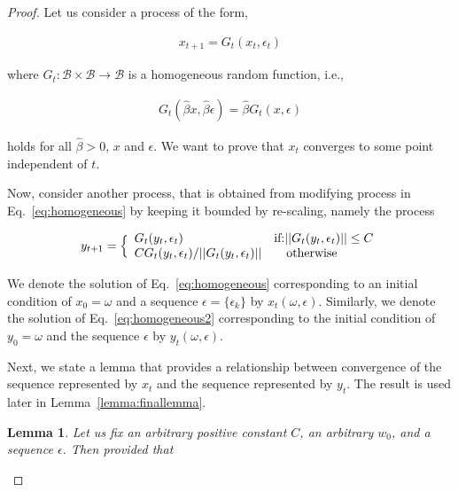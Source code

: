 \documentclass[jair, twoside,11pt,theapa]{article}
\newtheorem{lemm}{Lemma}
\begin{document}
\begin{proof}
Let us consider a process of the form, 

\begin{equation}\label{eq:homogeneous}
    \begin{array}{l}
         x_{t+1} = G_t(x_t, \epsilon_t)
    \end{array}
\end{equation}

\noindent where $G_t: \mathcal{B} \times \mathcal{B} \xrightarrow{} \mathcal{B}$
is a homogeneous random function, i.e., 

\begin{equation}
    \begin{array}{l}
         G_t(\hat{\beta} x, \hat{\beta} \epsilon) = \hat{\beta} G_t(x, \epsilon) 
    \end{array}{}
\end{equation}


\noindent holds for all $\hat{\beta}>0$, $x$ and $\epsilon$. We want to prove that $x_t$ converges to some point independent of $t$. 

Now, consider another process, that is obtained from modifying process in Eq.~\ref{eq:homogeneous} by keeping it bounded by re-scaling, namely the process 

\begin{equation}\label{eq:homogeneous2}
      y_{t+1} = \Bigl\{  
        \begin{array}{ll}
          G_t(y_t, \epsilon_t) &\textrm{if:} || G_t(y_t, \epsilon_t)|| \leq C \\
          C G_t(y_t, \epsilon_t)/ ||G_t(y_t, \epsilon_t)|| &~~~\textrm{otherwise}
        \end{array}
\end{equation}

We denote the solution of Eq.~\ref{eq:homogeneous} corresponding to an initial condition of $x_0 = \omega$ and a sequence $\epsilon = \{\epsilon_k\}$ by $x_t(\omega, \epsilon)$. Similarly, we denote the solution of Eq.~\ref{eq:homogeneous2} corresponding to the initial condition of $y_0 = \omega$ and the sequence $\epsilon$ by $y_t(\omega,\epsilon)$. 

Next, we state a lemma that provides a relationship between convergence of the sequence represented by $x_t$ and the sequence represented by $y_t$. The result is used later in Lemma~\ref{lemma:finallemma}.



\begin{lemm}\label{lemm:rescaling}
Let us fix an arbitrary positive constant $C$, an arbitrary $w_0$, and a sequence $\epsilon$. Then provided that 


\end{lemm}
\end{proof}
\end{document}
